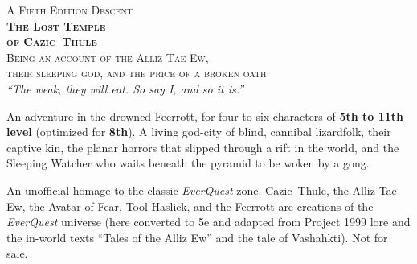 \documentclass[10pt,twoside]{article}
\begin{document}
\thispagestyle{empty}
\begin{center}
\vspace*{0.4in}

\vspace{0.35in}
{\scshape\color{stone}\large A Fifth Edition Descent}\\[0.15in]
{\Huge\bfseries\scshape\color{bloodred} The Lost Temple\\[2pt] of Cazic--Thule}\\[0.16in]
{\scshape\color{templegreen}\normalsize Being an account of the Alliz Tae Ew,\\ their sleeping god, and the price of a broken oath}\\[0.22in]
{\itshape\color{templegreen}\large ``The weak, they will eat. So say I, and so it is.''}\\[0.35in]

\begin{minipage}{0.82\textwidth}\centering\small\color{stone}
An adventure in the drowned Feerrott, for four to six characters of \textbf{5th to
11th level} (optimized for \textbf{8th}). A living god-city of blind, cannibal
lizardfolk, their captive kin, the planar horrors that slipped through a rift in
the world, and the Sleeping Watcher who waits beneath the pyramid to be woken by a
gong.
\end{minipage}

\vfill
{\footnotesize\color{stone}
An unofficial homage to the classic \textit{EverQuest} zone. Cazic--Thule, the
Alliz Tae Ew, the Avatar of Fear, Tool Haslick, and the Feerrott are creations of
the \textit{EverQuest} universe (here converted to 5e and adapted from Project 1999
lore and the in-world texts ``Tales of the Alliz Ew'' and the tale of Vashahkti).
Not for sale.\par}
\vspace{0.2in}
\end{center}
\clearpage
\end{document}
